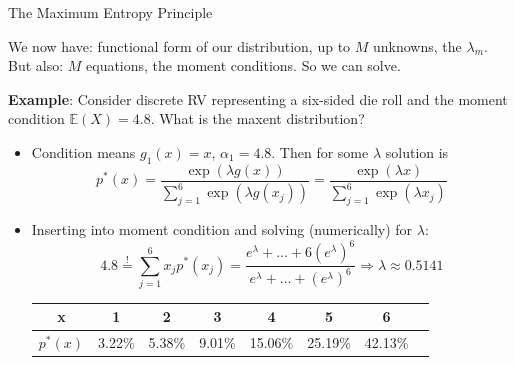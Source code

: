\documentclass[11pt,compress,t,notes=noshow, xcolor=table]{beamer}
\begin{document}
\begin{vbframe}{The Maximum Entropy Principle}

We now have: functional form of our distribution, up to $M$ unknowns, the $\lambda_m$. But also: $M$ equations, the moment conditions. So we can solve.

\vspace{0.5cm}

\textbf{Example}: Consider discrete RV representing a six-sided die roll and the moment condition $\mathbb{E}(X)=4.8$. What is the maxent distribution?\\

\begin{itemize}
\setlength{\itemsep}{0.9em}
    \item Condition means $g_1(x)=x$, $\alpha_1=4.8$. Then for some $\lambda$ solution is
    {\small $$p^{\ast}(x)=\frac{\exp{(\lambda g(x))}}{\sum_{j=1}^{6} \exp({\lambda g(x_j)})} = \frac{\exp{(\lambda x)}}{\sum_{j=1}^{6} \exp{(\lambda x_j)}}$$}
    \item Inserting into moment condition and solving (numerically) for $\lambda$: 
    $$4.8\overset{!}{=}\sum_{j=1}^{6} x_j p^{\ast}(x_j) = \frac{e^\lambda+\ldots+6(e^\lambda)^6}{e^\lambda+\ldots+(e^{\lambda})^6} \Rightarrow \lambda \approx 0.5141$$
{\small
\begin{tabular}{|c|c|c|c|c|c|c|c}
\hline
x & 1 & 2 & 3 & 4 & 5 & 6 \\ 
\hline
$p^{\ast}(x)$ & 3.22\% & 5.38\% & 9.01\% & 15.06\% & 25.19\% & 42.13\%\\ 
\hline
\end{tabular}
}
\end{itemize}
\end{vbframe}



\endlecture
\end{document}
